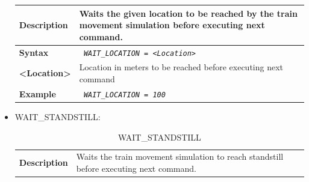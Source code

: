 \documentclass{template/openetcs}
\begin{document}
\begin{itemize}
\begin{longtable}{|l|l|}
			\hline						
				
				\begin{minipage}[t]{0.22\linewidth} \textbf{Description} \end{minipage} 
			&	\begin{minipage}[t]{0.78\linewidth} Waits the given location to be reached by the train movement simulation before executing next command. \end{minipage} \\
						
			\hline
									
				\begin{minipage}[t]{0.22\linewidth} \textbf{Syntax}	\end{minipage}
			&	\begin{minipage}[t]{0.78\linewidth} \emph{\texttt{ WAIT\_LOCATION = <Location>}} \end{minipage} \\
			
			\hline
			
				\begin{minipage}[t]{0.22\linewidth} \textbf{<Location>} \end{minipage}
			&	\begin{minipage}[t]{0.78\linewidth} Location in meters to be reached before executing next command \end{minipage} \\
			
			\hline
				
				\begin{minipage}[t]{0.22\linewidth} \textbf{Example} \end{minipage}
			&	\begin{minipage}[t]{0.78\linewidth} \emph{\texttt{ WAIT\_LOCATION = 100 }} \end{minipage} \\
			
			\hline\hline
			
		\end{longtable}
		
	\item WAIT\_STANDSTILL:				
		
		\begin{longtable}{|l|l|}
			\caption{WAIT\_STANDSTILL}\\ 
			\hline
			
				\begin{minipage}[t]{0.22\linewidth} \textbf{Description} \end{minipage} 
			&	\begin{minipage}[t]{0.78\linewidth} Waits the train movement simulation to reach standstill before executing next command. \end{minipage} \\
			

\end{longtable}
\end{itemize}
\end{document}
